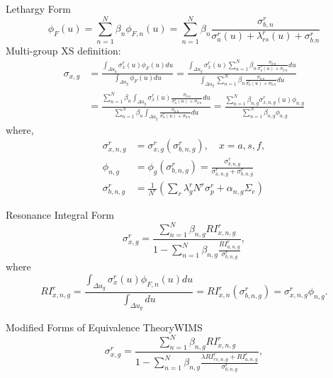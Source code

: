 \documentclass[sans,mathserif,aspectratio=169, 10pt]{beamer}
\newcommand\Fontvi{\fontsize{9}{7.2}\selectfont}
\begin{document}
\begin{frame}{Lethargy Form}
\Fontvi
\begin{equation}
\phi_F (u) = \sum_{n=1}^N \beta_n \phi_{F,n} (u) = \sum_{n=1}^N \beta_n \frac{\sigma_{b,n}^r}{\sigma_a^r(u) + \lambda_{rs}^r(u) + \sigma_{b.n}^r}
\end{equation}
Multi-group XS definition:
\begin{align}
\sigma_{x,g} &= \frac{\int_{\Delta u_g} \sigma_x^r (u) \phi_F (u)du}{\int_{\Delta u_g} \phi_F (u)du} = \frac{\int_{\Delta u_g} \sigma_x^r (u) \sum_{n=1}^N \beta_n \frac{\sigma_{b.n}}{\sigma_a^r (u) + \sigma_{b.n}} du}{\int_{\Delta u_g} \sum_{n=1}^N \beta_n \frac{\sigma_{b.n}}{\sigma_a^r (u) + \sigma_{b.n}} du} \nonumber \\
&= \frac{\sum_{n=1}^N \beta_n \int_{\Delta u_g} \sigma_x^r (u) \frac{\sigma_{b.n}}{\sigma_a^r (u) + \sigma_{b.n}} du}{\sum_{n=1}^N \beta_n \int_{\Delta u_g} \frac{\sigma_{b.n}}{\sigma_a^r (u) + \sigma_{b.n}} du} =  \frac{\sum_{n=1}^N \beta_{n,g} \sigma_{x,n,g}^r (u) \phi_{n,g}}{\sum_{n=1}^N \beta_{n,g} \phi_{n,g}} 
\end{align}
\pause
where,
\begin{align}
\sigma_{x,n,g}^r &= \sigma_{x,g}^r \left(\sigma_{b,n,g}^r \right), \quad x = a,s,f, \\
\phi_{n,g} &= \phi_g \left(\sigma_{b,n,g}^r \right) = \frac{\sigma_{b,n,g}^r}{\sigma_{a,n,g}^r + \sigma_{b,n,g}^r} \\
\sigma_{b,n,g}^r &= \frac{1}{N^r} \left(\sum_r \lambda_g^r N^r \sigma_p^r + \alpha_{n,g} \Sigma_e  \right)
\end{align}
\end{frame}

\begin{frame}{Resonance Integral Form}
\begin{equation}
\sigma_{x,g}^r = \frac{\sum_{n=1}^N \beta_{n,g} RI_{x,n,g}^r}{1 - \sum_{n=1}^N \beta_{n,g} \frac{RI_{a,n,g}^r}{\sigma_{b,n,g}^r}},
\end{equation}
\pause 
where 
\begin{equation}
RI_{x,n,g}^r = \frac{\int_{\Delta u_g} \sigma_x^r (u) \phi_{F,n} (u) du}{\int_{\Delta u_g} du} = RI_{x,n}^r \left( \sigma_{b,n,g}^r \right) = \sigma_{x,n,g}^r \phi_{n,g}.
\end{equation}
\end{frame}

\begin{frame}{Modified Forms of Equivalence Theory}{WIMS}
\begin{equation}
\sigma_{x,g}^r = \frac{\sum_{n=1}^N \beta_{n,g} RI_{x,n,g}^r}{1 - \sum_{n=1}^N \beta_{n,g} \frac{\lambda RI_{rs,n,g}^r + RI_{a,n,g}^r}{\sigma_{b,n,g}^r}},
\end{equation}
\end{frame}
\end{document}
